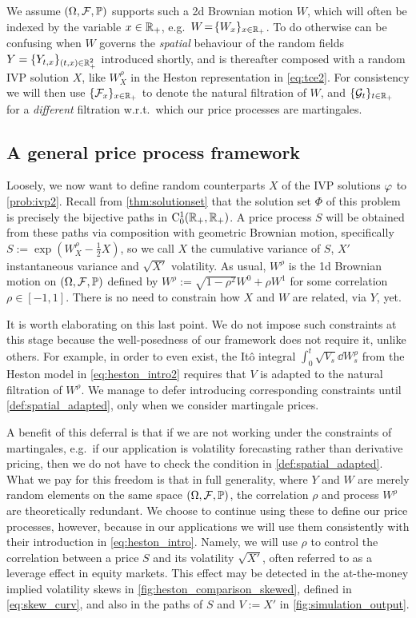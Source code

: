 We assume $(\Omega,\mathcal{F},\mathbb{P})$ supports such a 2d Brownian motion $W$, which will often be indexed by the variable $x\in\mathbb{R}_+$, e.g.~$W\!=\!\{W_x\}_{x\in\mathbb{R}_+}$. To do otherwise can be confusing when $W$ governs the \emph{spatial} behaviour of the random fields $Y=\{Y_{t,x}\}_{(t,x)\in\mathbb{R}^2_+}$ introduced shortly, and is thereafter composed with a random IVP solution $X$, like $W^\rho_{X}$ in the Heston representation in \autoref{eq:tce2}. For consistency we will then use $\{\mathcal{F}_x\}_{x\in\mathbb{R}_+}$ to denote the natural filtration of $W$, and $\{\mathcal{G}_t\}_{t\in\mathbb{R}_+}$ for a \emph{different} filtration w.r.t.~which our price processes are martingales.

\subsection{A general price process framework}\label{sec:base_frame}

Loosely, we now want to define random counterparts $X$ of the IVP solutions $\varphi$ to \autoref{prob:ivp2}. Recall from \autoref{thm:solutionset} that the solution set $\Phi$ of this problem is precisely the bijective paths in $\mathrm{C}^1_0(\mathbb{R}_+,\mathbb{R}_+)$. A price process $S$ will be obtained from these paths via composition with geometric Brownian motion, specifically $S:=\exp(W^\rho_X - \frac12 X)$, so we call $X$ the cumulative variance of $S$, $X'$ instantaneous variance and $\sqrt{X'}$ volatility. As usual, $W^\rho$ is the 1d Brownian motion on $(\Omega,\mathcal{F},\mathbb{P})$ defined by $W^\rho:=\sqrt{1-\rho^2}W^0 + \rho W^1$ for some correlation $\rho\in[-1,1]$. There is no need to constrain how $X$ and $W$ are related, via $Y$, yet.

It is worth elaborating on this last point. We do not impose such constraints at this stage because the well-posedness of our framework does not require it, unlike others. For example, in order to even exist, the It\^o integral $\int_0^t\sqrt{V_s}\dd W_s^\rho$ from the Heston model in \autoref{eq:heston_intro2} requires that $V$ is adapted to the natural filtration of $W^\rho$. We manage to defer introducing corresponding constraints until \autoref{def:spatial_adapted}, only when we consider martingale prices.

A benefit of this deferral is that if we are not working under the constraints of martingales, e.g.~if our application is volatility forecasting rather than derivative pricing, then we do not have to check the condition in \autoref{def:spatial_adapted}. What we pay for this freedom is that in full generality, where $Y$ and $W$ are merely random elements on the same space $(\Omega,\mathcal{F},\mathbb{P})$, the correlation $\rho$ and process $W^\rho$ are theoretically redundant. We choose to continue using these to define our price processes, however, because in our applications we will use them consistently with their introduction in \autoref{eq:heston_intro}. Namely, we will use $\rho$ to control the correlation between a price $S$ and its volatility $\sqrt{X'}$, often referred to as a leverage effect in equity markets. This effect may be detected in the at-the-money implied volatility skews in \autoref{fig:heston_comparison_skewed}, defined in \autoref{eq:skew_curv}, and also in the paths of $S$ and $V:=X'$ in \autoref{fig:simulation_output}.

